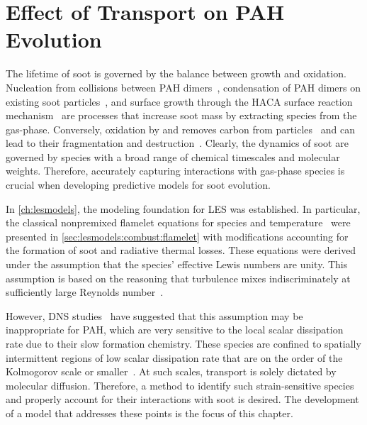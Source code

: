 \chapter{Effect of Transport on PAH Evolution\label{ch:transport}}

The lifetime of soot is governed by the balance between growth and oxidation. Nucleation from collisions between PAH dimers~\cite{blanquart2009,schuetz2002,frenklach1991,wang2011}, condensation of PAH dimers on existing soot particles~\cite{blanquart2009,hmom2009}, and surface growth through the HACA surface reaction mechanism~\cite{frenklach1985,frenklach1991} are processes that increase soot mass by extracting species from the gas-phase. Conversely, oxidation by  and  removes carbon from particles~\cite{stanmore2001,neoh1981,kazakov1995} and can lead to their fragmentation and destruction~\cite{neoh1984,mueller2011}. Clearly, the dynamics of soot are governed by species with a broad range of chemical timescales and molecular weights. Therefore, accurately capturing interactions with gas-phase species is crucial when developing predictive models for soot evolution.

In \cref{ch:lesmodels}, the modeling foundation for LES was established. In particular, the classical nonpremixed flamelet equations for species and temperature~\cite{peters1984} were presented in \cref{sec:lesmodels:combust:flamelet} with modifications accounting for the formation of soot and radiative thermal losses. These equations were derived under the assumption that the species' effective Lewis numbers are unity. This assumption is based on the reasoning that turbulence mixes indiscriminately at sufficiently large Reynolds number~\cite{pitsch19981057}.


However, DNS studies~\cite{bisetti2012,attili2014} have suggested that this assumption may be inappropriate for PAH, which are very sensitive to the local scalar dissipation rate due to their slow formation chemistry. These species are confined to spatially intermittent regions of low scalar dissipation rate that are on the order of the Kolmogorov scale or smaller~\cite{vaishnavi2008}. At such scales, transport is solely dictated by molecular diffusion. Therefore, a method to identify such strain-sensitive species and properly account for their interactions with soot is desired. The development of a model that addresses these points is the focus of this chapter.

